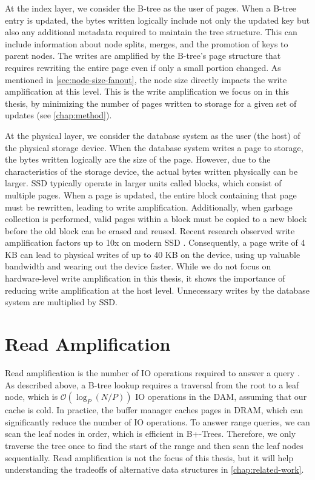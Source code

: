 At the index layer, we consider the B-tree as the user of pages.
When a B-tree entry is updated, the bytes written logically include not only the updated key but also any additional metadata required to maintain the tree structure.
This can include information about node splits, merges, and the promotion of keys to parent nodes.
The writes are amplified by the B-tree's page structure that requires rewriting the entire page even if only a small portion changed.
As mentioned in \autoref{sec:node-size-fanout}, the node size directly impacts the write amplification at this level.
This is the write amplification we focus on in this thesis, by minimizing the number of pages written to storage for a given set of updates (see \autoref{chap:method}).

At the physical layer, we consider the database system as the user (the host) of the physical storage device.
When the database system writes a page to storage, the bytes written logically are the size of the page.
However, due to the characteristics of the storage device, the actual bytes written physically can be larger.
\ac{SSD} typically operate in larger units called blocks, which consist of multiple pages.
When a page is updated, the entire block containing that page must be rewritten, leading to write amplification.
Additionally, when garbage collection is performed, valid pages within a block must be copied to a new block before the old block can be erased and reused.
Recent research observed write amplification factors up to 10x on modern \ac{SSD} \cite{haas2025ssd}.
Consequently, a page write of 4 KB can lead to physical writes of up to 40 KB on the device, using up valuable bandwidth and wearing out the device faster.
While we do not focus on hardware-level write amplification in this thesis, it shows the importance of reducing write amplification at the host level.
Unnecessary writes by the database system are multiplied by \ac{SSD}.


\section{Read Amplification}
Read amplification is the number of \ac{IO} operations required to answer a query \cite{kuszmaul2014fractal}.
As described above, a B-tree lookup requires a traversal from the root to a leaf node, which is $\mathcal{O}(\log_P(N/P))$ \ac{IO} operations in the \ac{DAM}, assuming that our cache is cold.
In practice, the buffer manager caches pages in \ac{DRAM}, which can significantly reduce the number of \ac{IO} operations.
To answer range queries, we can scan the leaf nodes in order, which is efficient in B+-Trees.
Therefore, we only traverse the tree once to find the start of the range and then scan the leaf nodes sequentially.
Read amplification is not the focus of this thesis, but it will help understanding the tradeoffs of alternative data structures in \autoref{chap:related-work}.

